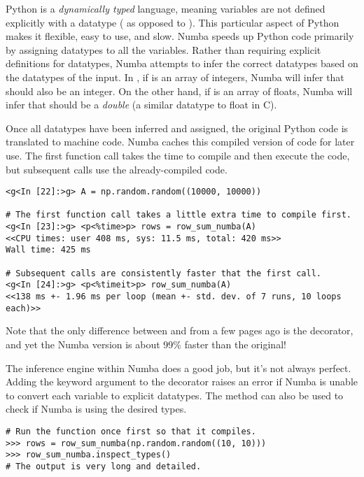 Python is a \emph{dynamically typed} language, meaning variables are not defined explicitly with a datatype ( as opposed to ).
This particular aspect of Python makes it flexible, easy to use, and slow.
Numba speeds up Python code primarily by assigning datatypes to all the variables.
Rather than requiring explicit definitions for datatypes, Numba attempts to infer the correct datatypes based on the datatypes of the input.
In , if  is an array of integers, Numba will infer that  should also be an integer.
On the other hand, if  is an array of floats, Numba will infer that  should be a \emph{double} (a similar datatype to float in C).

Once all datatypes have been inferred and assigned, the original Python code is translated to machine code. %
Numba caches this compiled version of code for later use.
The first function call takes the time to compile and then execute the code, but subsequent calls use the already-compiled code.

\begin{lstlisting}
<g<In [22]:>g> A = np.random.random((10000, 10000))

# The first function call takes a little extra time to compile first.
<g<In [23]:>g> <p<%time>p> rows = row_sum_numba(A)
<<CPU times: user 408 ms, sys: 11.5 ms, total: 420 ms>>
Wall time: 425 ms

# Subsequent calls are consistently faster that the first call.
<g<In [24]:>g> <p<%timeit>p> row_sum_numba(A)
<<138 ms +- 1.96 ms per loop (mean +- std. dev. of 7 runs, 10 loops each)>>
\end{lstlisting}

Note that the only difference between  and  from a few pages ago is the  decorator, and yet the Numba version is about 99\% faster than the original!

The inference engine within Numba does a good job, but it's not always perfect.
Adding the keyword argument  to the  decorator raises an error if Numba is unable to convert each variable to explicit datatypes.
The  method can also be used to check if Numba is using the desired types.

\begin{lstlisting}
# Run the function once first so that it compiles.
>>> rows = row_sum_numba(np.random.random((10, 10)))
>>> row_sum_numba.inspect_types()
# The output is very long and detailed.
\end{lstlisting}

